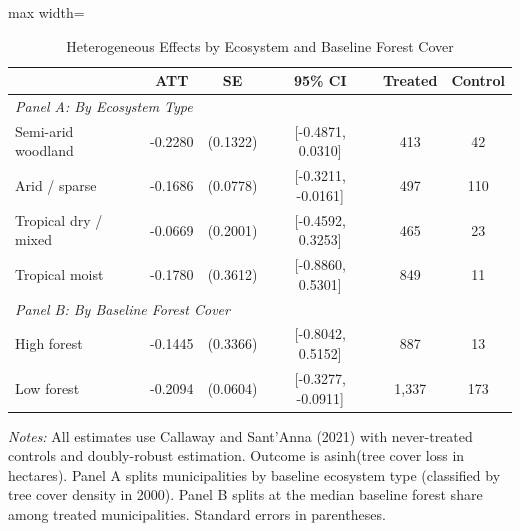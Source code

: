 \begin{table}[htbp]
\centering
\caption{Heterogeneous Effects by Ecosystem and Baseline Forest Cover}
\label{tab:heterogeneity}
\begin{adjustbox}{max width=\textwidth}
\begin{tabular}{lccccc}
\toprule
 & ATT & SE & 95\% CI & Treated & Control \\
\midrule
\multicolumn{6}{l}{\textit{Panel A: By Ecosystem Type}} \\
\quad Semi-arid woodland & -0.2280 & (0.1322) & [-0.4871, 0.0310] & 413 & 42 \\
\quad Arid / sparse & -0.1686 & (0.0778) & [-0.3211, -0.0161] & 497 & 110 \\
\quad Tropical dry / mixed & -0.0669 & (0.2001) & [-0.4592, 0.3253] & 465 & 23 \\
\quad Tropical moist & -0.1780 & (0.3612) & [-0.8860, 0.5301] & 849 & 11 \\
\midrule
\multicolumn{6}{l}{\textit{Panel B: By Baseline Forest Cover}} \\
\quad High forest & -0.1445 & (0.3366) & [-0.8042, 0.5152] & 887 & 13 \\
\quad Low forest & -0.2094 & (0.0604) & [-0.3277, -0.0911] & 1,337 & 173 \\
\bottomrule
\end{tabular}
\end{adjustbox}
\begin{tablenotes}[flushleft]
\small
\item \textit{Notes:} All estimates use Callaway and Sant'Anna (2021) with never-treated controls and doubly-robust estimation. Outcome is asinh(tree cover loss in hectares). Panel A splits municipalities by baseline ecosystem type (classified by tree cover density in 2000). Panel B splits at the median baseline forest share among treated municipalities. Standard errors in parentheses.
\end{tablenotes}
\end{table}
